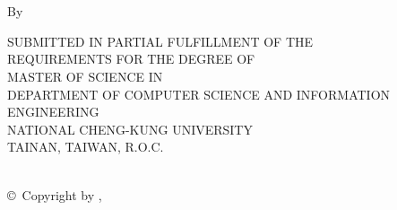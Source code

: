 \begin{titlepage}
\begin{center}
\makebox[7.2em][l]{\Large\advisorCnameB}\\%
\fi
%
\ifx \advisorCnameC  \itsempty
\relax %
\else
\hspace{2.4em}%
\makebox[4.8em][s]{}%
\makebox[1em][c]{}%
\makebox[7.2em][l]{\Large\advisorCnameC}\\%
\fi
%
\vfill
{}%
%
\end{center}
\renewcommand{\baselinestretch}{\mybaselinestretch}   %
\normalsize
\end{titlepage}

    \thispagestyle{empty}%
    \null\vskip0.5in
    \begin{center}
        \Large\uppercase\expandafter{\eTitle}
    \end{center}
    \vfill
    \begin{center}
        \large\rm By \\
        {\large\rm \myEname}
    \end{center}
    \vfill
    \begin{center}
        \footnotesize SUBMITTED IN PARTIAL FULFILLMENT OF THE \\
        REQUIREMENTS FOR THE DEGREE OF \\
        MASTER OF SCIENCE IN \\
        DEPARTMENT OF COMPUTER SCIENCE AND INFORMATION ENGINEERING \\
        NATIONAL CHENG-KUNG UNIVERSITY \\
        TAINAN, TAIWAN, R.O.C. \\
        {\eMonth \ \eYear}
    \end{center}
    \vskip0.75in
    \begin{center}
        \rm \copyright\ Copyright by {\myEname}, \eYear
    \end{center}


























